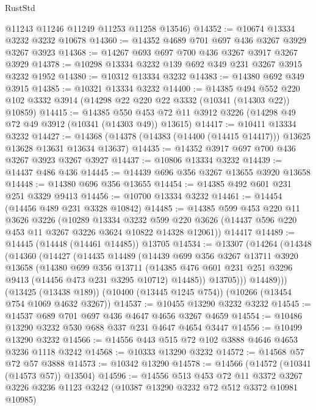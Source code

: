 \begin{lexlean}{RustStd}
\begin{coremodule}
{\begin{coremodule}
{{{{{{{{{{{{{{{{{{{{{{{{{      @11243
      @11246
      @11249
      @11253
      @11258
      @13546)
@14352 := @10674 @13334 @3232 @3232 @10678
@14360 := @14352 @4689 @701 @697 @436 @3267 @3929 @3267 @3923
@14368 := @14267 @693 @697 @700 @436 @3267 @3917 @3267 @3929
@14378 := @10298 @13334 @3232 @139 @692 @349 @231 @3267 @3915 @3232 @1952
@14380 := @10312 @13334 @3232
@14383 := @14380 @692 @349 @3915
@14385 := @10321 @13334 @3232
@14400 := @14385
    @494
    @552
    @220
    @102
    @3332
    @3914
    (@14298 @22 @220 @22 @3332 (@10341 (@14303 @22)) @10859)
@14415 := @14385
    @550
    @453
    @72
    @11
    @3912
    @3226
    (@14298 @49 @72 @49 @3912 (@10341 (@14303 @49)) @13615)
@14417 := @10411 @13334 @3232
@14427 := @14368 (@14378 (@14383 (@14400 (@14415 @14417))) @13625 @13628 @13631 @13634 @13637)
@14435 := @14352 @3917 @697 @700 @436 @3267 @3923 @3267 @3927
@14437 := @10806 @13334 @3232
@14439 := @14437 @486 @436
@14445 := @14439 @696 @356 @3267 @13655 @3920 @13658
@14448 := @14380 @696 @356 @13655
@14454 := @14385 @492 @601 @231 @251 @3329 @9413
@14456 := @10700 @13334 @3232
@14461 := @14454 (@14456 @489 @231 @3328 @10842)
@14485 := @14385
    @599
    @453
    @220
    @11
    @3626
    @3226
    (@10289
      @13334
      @3232
      @599
      @220
      @3626
      (@14437 @596 @220 @453 @11 @3267 @3226 @3624 @10822 @14328 @12061))
    @14417
@14489 := @14445 (@14448 (@14461 @14485)) @13705
@14534 := @13307
    (@14264
      (@14348
        (@14360
          (@14427
            (@14435
              @14489
              (@14439
                @699
                @356
                @3267
                @13711
                @3920
                @13658
                (@14380
                  @699
                  @356
                  @13711
                  (@14385 @476 @601 @231 @251 @3296 @9413 (@14456 @473 @231 @3295 @10712) @14485))
                @13705)))
          @14489)))
    (@13425 (@13438 @189))
    (@10400 (@13445 @1245 @754))
    (@10266 (@13454 @754 @1069 @4632 @3267))
@14537 := @10455 @13290 @3232 @3232
@14545 := @14537 @689 @701 @697 @436 @4647 @4656 @3267 @4659
@14554 := @10486 @13290 @3232 @530 @688 @337 @231 @4647 @4654 @3447
@14556 := @10499 @13290 @3232
@14566 := @14556 @443 @515 @72 @102 @3888 @4646 @4653 @3236 @1118 @3242
@14568 := @10333 @13290 @3232
@14572 := @14568 @57 @72 @57 @3888
@14573 := @10342 @13290
@14578 := @14566 (@14572 (@10341 (@14573 @57)) @13504)
@14596 := @14556
    @513
    @453
    @72
    @11
    @3372
    @3267
    @3226
    @3236
    @1123
    @3242
    (@10387 @13290 @3232 @72 @512 @3372 @10981 @10985)
}}}}}}}}}}}}}}}}}}}}}}}}}
\end{coremodule}}
\end{coremodule}
\end{lexlean}
